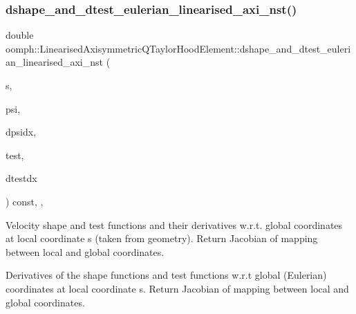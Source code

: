 \mbox{\label{classoomph_1_1LinearisedAxisymmetricQTaylorHoodElement_ad659c48a698966a356977f6576ad844c}} 
\subsubsection{\texorpdfstring{dshape\+\_\+and\+\_\+dtest\+\_\+eulerian\+\_\+linearised\+\_\+axi\+\_\+nst()}{dshape\_and\_dtest\_eulerian\_linearised\_axi\_nst()}}
{\footnotesize\ttfamily double oomph\+::\+Linearised\+Axisymmetric\+Q\+Taylor\+Hood\+Element\+::dshape\+\_\+and\+\_\+dtest\+\_\+eulerian\+\_\+linearised\+\_\+axi\+\_\+nst (\begin{DoxyParamCaption}\item[{const \hyperlink{classoomph_1_1Vector}{Vector}$<$ double $>$ \&}]{s,  }\item[{\hyperlink{classoomph_1_1Shape}{Shape} \&}]{psi,  }\item[{\hyperlink{classoomph_1_1DShape}{D\+Shape} \&}]{dpsidx,  }\item[{\hyperlink{classoomph_1_1Shape}{Shape} \&}]{test,  }\item[{\hyperlink{classoomph_1_1DShape}{D\+Shape} \&}]{dtestdx }\end{DoxyParamCaption}) const\hspace{0.3cm}{\ttfamily [inline]}, {\ttfamily [protected]}, {\ttfamily [virtual]}}



Velocity shape and test functions and their derivatives w.\+r.\+t. global coordinates at local coordinate s (taken from geometry). Return Jacobian of mapping between local and global coordinates. 

Derivatives of the shape functions and test functions w.\+r.\+t global (Eulerian) coordinates at local coordinate s. Return Jacobian of mapping between local and global coordinates. 


